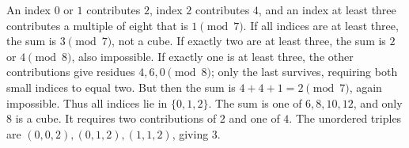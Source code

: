 An index $0$ or $1$ contributes $2$, index $2$ contributes $4$, and an index at least three contributes a multiple of eight that is $1\pmod7$.
If all indices are at least three, the sum is $3\pmod7$, not a cube. If exactly two are at least three, the sum is $2$ or $4\pmod8$, also impossible. If exactly one is at least three, the other contributions give residues $4,6,0\pmod8$; only the last survives, requiring both small indices to equal two. But then the sum is $4+4+1=2\pmod7$, again impossible.
Thus all indices lie in $\{0,1,2\}$. The sum is one of $6,8,10,12$, and only $8$ is a cube. It requires two contributions of $2$ and one of $4$. The unordered triples are $(0,0,2),(0,1,2),(1,1,2)$, giving $\boxed3$.
